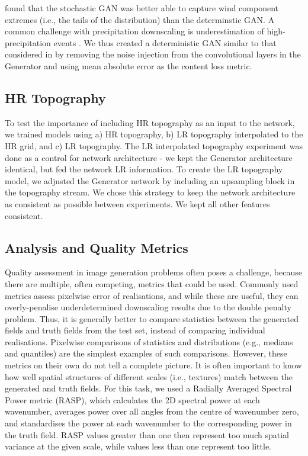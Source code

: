 \documentclass{ametsocV6.1}
\begin{document}
\citet{daust2024capturing} found that the stochastic GAN was better able to capture wind component extremes (i.e., the tails of the distribution) than the determinstic GAN. A common challenge with precipitation downscaling is underestimation of high-precipitation events \citep{kumar2023modern}. We thus created a deterministic GAN similar to that considered in \citet{daust2024capturing} by removing the noise injection from the convolutional layers in the Generator and using mean absolute error as the content loss metric. 

\subsection{HR Topography}
To test the importance of including HR topography as an input to the network, we trained models using a) HR topography, b) LR topography interpolated to the HR grid, and c) LR topography. The LR interpolated topography experiment was done as a control for network architecture - we kept the Generator architecture identical, but fed the network LR information. To create the LR topography model, we adjusted the Generator network by including an upsampling block in the topography stream. We chose this strategy to keep the network architecture as consistent as possible between experiments. We kept all other features consistent. 

\subsection{Analysis and Quality Metrics}
Quality assessment in image generation problems often poses a challenge, because there are multiple, often competing, metrics that could be used. Commonly used metrics assess pixelwise error of realisations, and while these are useful, they can overly-penalise underdetermined downscaling results due to the double penalty problem. Thus, it is generally better to compare statistics between the generated fields and truth fields from the test set, instead of comparing individual realisations. Pixelwise comparisons of statistics and distributions (e.g., medians and quantiles) are the simplest examples of such comparisons. However, these metrics on their own do not tell a complete picture. It is often important to know how well spatial structures of different scales (i.e., textures) match between the generated and truth fields. For this task, we used a Radially Averaged Spectral Power metric (RASP), which calculates the 2D spectral power at each wavenumber, averages power over all angles from the centre of wavenumber zero, and standardises the power at each wavenumber to the corresponding power in the truth field. RASP values greater than one then represent too much spatial variance at the given scale, while values less than one represent too little.
\end{document}
